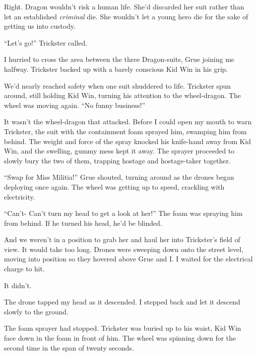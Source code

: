 Right.  Dragon wouldn't risk a human life.  She'd discarded her suit rather than let an established \emph{criminal} die.  She wouldn't let a young hero die for the sake of getting us into custody.



``Let's go!'' Trickster called.



I hurried to cross the area between the three Dragon-suits, Grue joining me halfway.  Trickster backed up with a barely conscious Kid Win in his grip.



We'd nearly reached safety when one suit shuddered to life.  Trickster spun around, still holding Kid Win, turning his attention to the wheel-dragon.  The wheel was moving again. ``No funny business!''



It wasn't the wheel-dragon that attacked.  Before I could open my mouth to warn Trickster, the suit with the containment foam sprayed him, swamping him from behind.  The weight and force of the spray knocked his knife-hand away from Kid Win, and the swelling, gummy mess kept it away.  The sprayer proceeded to slowly bury the two of them, trapping hostage and hostage-taker together.



``Swap for Miss Militia!''  Grue shouted, turning around as the drones began deploying once again.  The wheel was getting up to speed, crackling with electricity.



``Can't- Can't turn my head to get a look at her!''  The foam was spraying him from behind.  If he turned his head, he'd be blinded.



And we weren't in a position to grab her and haul her into Trickster's field of view.  It would take too long.  Drones were sweeping down onto the street level, moving into position so they hovered above Grue and I.  I waited for the electrical charge to hit.



It didn't.



The drone tapped my head as it descended.  I stepped back and let it descend slowly to the ground.



The foam sprayer had stopped.  Trickster was buried up to his waist, Kid Win face down in the foam in front of him.  The wheel was spinning down for the second time in the span of twenty seconds.




